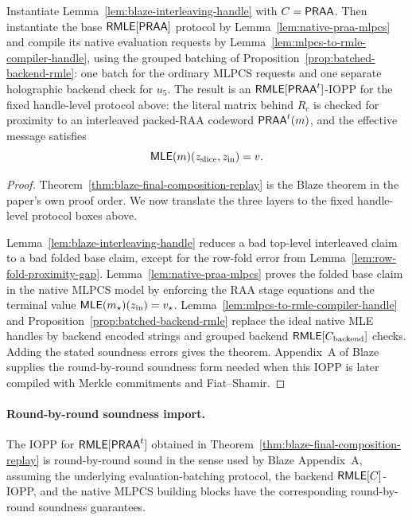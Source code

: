 \begin{theorem}
\label{thm:interleaved-praa-rmle-iopp-handle}
Instantiate Lemma~\ref{lem:blaze-interleaving-handle} with \(C=\mathsf{PRAA}\).  Then
instantiate the base \(\mathsf{RMLE}[\mathsf{PRAA}]\) protocol by
Lemma~\ref{lem:native-praa-mlpcs} and compile its native evaluation requests by
Lemma~\ref{lem:mlpcs-to-rmle-compiler-handle}, using the grouped batching of
Proposition~\ref{prop:batched-backend-rmle}: one batch for the ordinary MLPCS
requests and one separate holographic backend check for \(u_5\).  The result is an
\(\mathsf{RMLE}[\mathsf{PRAA}^t]\)-IOPP for the fixed handle-level protocol above:
the literal matrix behind \(R_c\) is checked for proximity to an interleaved
packed-RAA codeword \(\mathsf{PRAA}^t(m)\), and the effective message satisfies
\[
  \mathsf{MLE}(m)(z_{\mathrm{slice}},z_{\mathrm{in}})=v.
\]
\end{theorem}

\begin{proof}
Theorem~\ref{thm:blaze-final-composition-replay} is the Blaze theorem in the
paper's own proof order.  We now translate the three layers to the fixed
handle-level protocol boxes above.

Lemma~\ref{lem:blaze-interleaving-handle} reduces a bad top-level interleaved
claim to a bad folded base claim, except for the row-fold error from
Lemma~\ref{lem:row-fold-proximity-gap}.  Lemma~\ref{lem:native-praa-mlpcs}
proves the folded base claim in the native MLPCS model by enforcing the RAA
stage equations and the terminal value \(\mathsf{MLE}(m_\star)(z_{\mathrm{in}})=v_\star\).
Lemma~\ref{lem:mlpcs-to-rmle-compiler-handle} and
Proposition~\ref{prop:batched-backend-rmle} replace the ideal native MLE
handles by backend encoded strings and grouped backend
\(\mathsf{RMLE}[C_{\mathrm{backend}}]\) checks.  Adding the stated soundness errors gives
the theorem.  Appendix~A of
Blaze supplies the round-by-round soundness form needed when this IOPP is later
compiled with Merkle commitments and Fiat--Shamir.
\end{proof}

\paragraph{Round-by-round soundness import.}

\begin{proposition}
\label{prop:blaze-rbr-replay}
The IOPP for \(\mathsf{RMLE}[\mathsf{PRAA}^t]\) obtained in
Theorem~\ref{thm:blaze-final-composition-replay} is round-by-round sound in
the sense used by Blaze Appendix~A, assuming the underlying evaluation-batching
protocol, the backend \(\mathsf{RMLE}[C]\)-IOPP, and the native MLPCS building blocks
have the corresponding round-by-round soundness guarantees.
\end{proposition}

